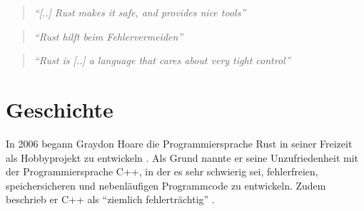 \begin{quotation}
	\textit{\enquote{[..] Rust makes it safe, and  provides nice tools}} 
	\cite[Folie 130, Federico Mena-Quintero in \enquote{Ersetzen von C Bibliotheken durch Rust}]{rust:c_is_hostile_mena}
\end{quotation}

\begin{quotation}
	\textit{\enquote{Rust hilft beim Fehlervermeiden}} 
	\cite[Federico Mena-Quintero in einem Interview]{rust:c_is_hostile_golem}
\end{quotation}

\begin{quotation}
	\textit{\enquote{Rust is [..] a language that cares about very tight control}}
	\cite[Diskussion zwischen Programmierern auf Reddit]{rust:tight_control}
\end{quotation}






\clearpage
\section{Geschichte}
\label{rust:history}

In 2006 begann Graydon Hoare die Programmiersprache Rust in seiner Freizeit als Hobbyprojekt zu entwickeln \cite{rust:faq}.
Als Grund nannte er seine Unzufriedenheit mit der Programmiersprache C++, in der es sehr schwierig sei, fehlerfreien, speichersicheren und nebenläufigen Programmcode zu entwickeln.
Zudem beschrieb er C++ als \enquote{ziemlich fehlerträchtig} \cite{rust:heise_interview_graydon}.

